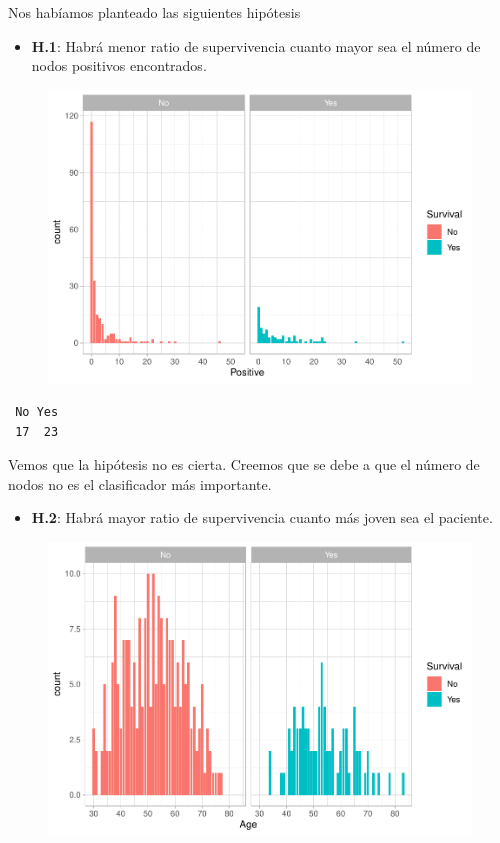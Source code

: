 Nos habíamos planteado las siguientes hipótesis

\begin{itemize}
    \item \textbf{H.1}: Habrá menor ratio de supervivencia cuanto mayor sea el número de nodos positivos encontrados.
\end{itemize}

\begin{figure}[H]\center\includegraphics[width=.95\linewidth]{img/EDA2_files/figure-latex/unnamed-chunk-31-1} \caption{}\end{figure}

\begin{verbatim}
 No Yes 
 17  23 
\end{verbatim}

Vemos que la hipótesis no es cierta. Creemos que se debe a que el número de nodos no es el clasificador más importante.

\newpage

\begin{itemize}
    \item \textbf{H.2}: Habrá mayor ratio de supervivencia cuanto más joven sea el paciente.
\end{itemize}

\begin{figure}[H]\includegraphics[width=.9\linewidth]{img/EDA2_files/figure-latex/unnamed-chunk-33-1} \caption{}\end{figure}

